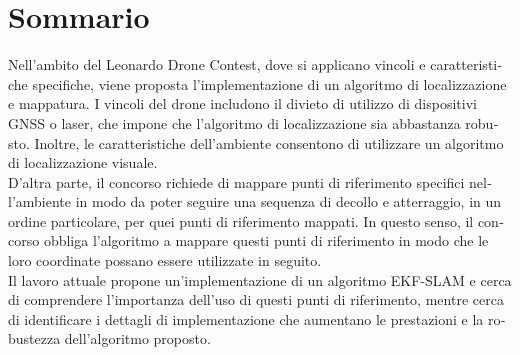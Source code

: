 \chapter*{Sommario}
\begin{otherlanguage}{italian}

Nell'ambito del Leonardo Drone Contest, dove si applicano vincoli e caratteristiche specifiche, viene proposta l'implementazione di un algoritmo di localizzazione e mappatura. I vincoli del drone includono il divieto di utilizzo di dispositivi GNSS o laser, che impone che l'algoritmo di localizzazione sia abbastanza robusto. Inoltre, le caratteristiche dell'ambiente consentono di utilizzare un algoritmo di localizzazione visuale. \\

D'altra parte, il concorso richiede di mappare punti di riferimento specifici nell'ambiente in modo da poter seguire una sequenza di decollo e atterraggio, in un ordine particolare, per quei punti di riferimento mappati. In questo senso, il concorso obbliga l'algoritmo a mappare questi punti di riferimento in modo che le loro coordinate possano essere utilizzate in seguito. \\

Il lavoro attuale propone un'implementazione di un algoritmo EKF-SLAM e cerca di comprendere l'importanza dell'uso di questi punti di riferimento, mentre cerca di identificare i dettagli di implementazione che aumentano le prestazioni e la robustezza dell'algoritmo proposto.

\end{otherlanguage}
\endgroup